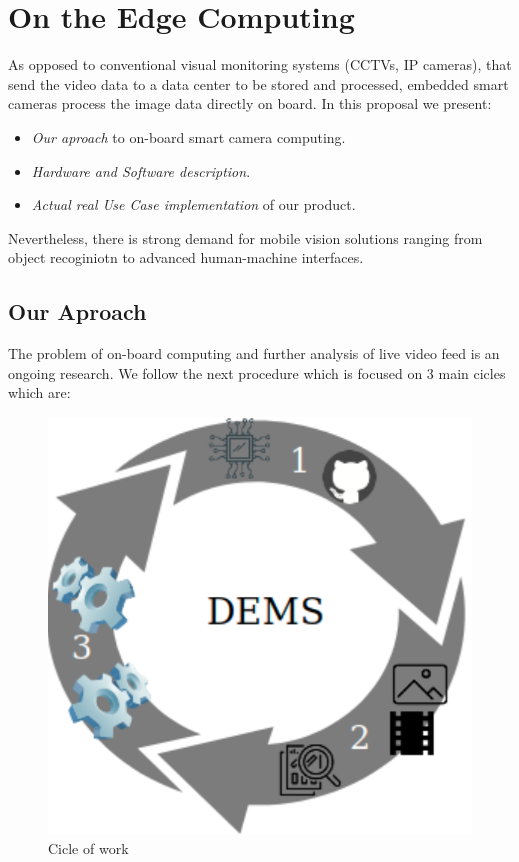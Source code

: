 \section{On the Edge Computing}

As opposed to conventional visual monitoring systems (CCTVs, IP cameras), that send the video data to a data center to be stored and processed, embedded smart cameras process the image data directly on board. 
In this proposal we present:

\begin{itemize}[noitemsep] %
\item \textit{Our aproach} to on-board smart camera computing.
\item \textit{Hardware and Software description}.
\item \textit{Actual real Use Case implementation} of our product. 
\end{itemize}


 Nevertheless, there is strong demand for mobile vision solutions ranging from object recoginiotn to advanced human-machine interfaces.

\subsection{Our Aproach}

The problem of on-board computing and further analysis of live video feed is an ongoing research. We follow the next procedure which is focused on 3 main cicles which are:

\begin{figure}[H]\centering
	\includegraphics[width=\linewidth]{images/cicle}
	\caption{Cicle of work}
	\label{fig:cicle}
\end{figure}


